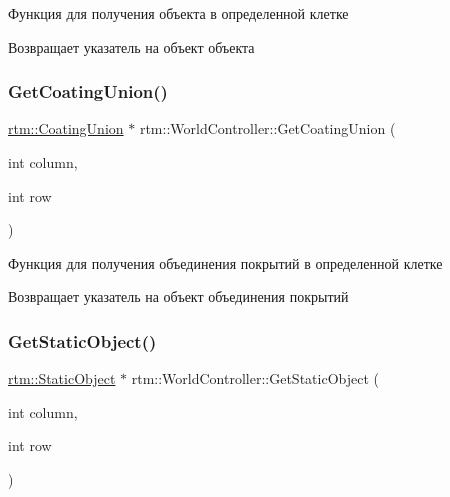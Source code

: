Функция для получения объекта в определенной клетке 

\begin{DoxyReturn}{Возвращает}
указатель на объект объекта 
\end{DoxyReturn}
\mbox{\label{classrtm_1_1_world_controller_ac43dfd6de088ba04aefc8b4d9d118ea7}} 
\subsubsection{\texorpdfstring{Get\+Coating\+Union()}{GetCoatingUnion()}}
{\footnotesize\ttfamily \hyperlink{classrtm_1_1_coating_union}{rtm\+::\+Coating\+Union} $\ast$ rtm\+::\+World\+Controller\+::\+Get\+Coating\+Union (\begin{DoxyParamCaption}\item[{int}]{column,  }\item[{int}]{row }\end{DoxyParamCaption})}



Функция для получения объединения покрытий в определенной клетке 

\begin{DoxyReturn}{Возвращает}
указатель на объект объединения покрытий 
\end{DoxyReturn}
\mbox{\label{classrtm_1_1_world_controller_ae949e287815fd3327b04b4225255bcf1}} 
\subsubsection{\texorpdfstring{Get\+Static\+Object()}{GetStaticObject()}}
{\footnotesize\ttfamily \hyperlink{classrtm_1_1_static_object}{rtm\+::\+Static\+Object} $\ast$ rtm\+::\+World\+Controller\+::\+Get\+Static\+Object (\begin{DoxyParamCaption}\item[{int}]{column,  }\item[{int}]{row }\end{DoxyParamCaption})}




